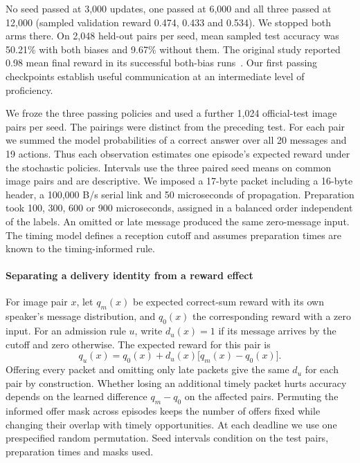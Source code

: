 \documentclass[a4paper,fleqn]{cas-dc}
\begin{document}
No seed passed at 3,000 updates, one passed at 6,000 and all three passed at 12,000 (sampled validation reward 0.474, 0.433 and 0.534). We stopped both arms there. On 2,048 held-out pairs per seed, mean sampled test accuracy was 50.21\% with both biases and 9.67\% without them. The original study reported 0.98 mean final reward in its successful both-bias runs~\citep{eccles2019biases}. Our first passing checkpoints establish useful communication at an intermediate level of proficiency.

We froze the three passing policies and used a further 1,024 official-test image pairs per seed. The pairings were distinct from the preceding test. For each pair we summed the model probabilities of a correct answer over all 20 messages and 19 actions. Thus each observation estimates one episode's expected reward under the stochastic policies. Intervals use the three paired seed means on common image pairs and are descriptive. We imposed a 17-byte packet including a 16-byte header, a 100,000 B/s serial link and 50 microseconds of propagation. Preparation took 100, 300, 600 or 900 microseconds, assigned in a balanced order independent of the labels. An omitted or late message produced the same zero-message input. The timing model defines a reception cutoff and assumes preparation times are known to the timing-informed rule.

\paragraph{Separating a delivery identity from a reward effect}
For image pair $x$, let $q_m(x)$ be expected correct-sum reward with its own speaker's message distribution, and $q_0(x)$ the corresponding reward with a zero input. For an admission rule $u$, write $d_u(x)=1$ if its message arrives by the cutoff and zero otherwise. The expected reward for this pair is
\begin{equation}
 q_u(x)=q_0(x)+d_u(x)\bigl[q_m(x)-q_0(x)\bigr].
 \label{eq:mnist_delivery}
\end{equation}
Offering every packet and omitting only late packets give the same $d_u$ for each pair by construction. Whether losing an additional timely packet hurts accuracy depends on the learned difference $q_m-q_0$ on the affected pairs. Permuting the informed offer mask across episodes keeps the number of offers fixed while changing their overlap with timely opportunities. At each deadline we use one prespecified random permutation. Seed intervals condition on the test pairs, preparation times and masks used.
\end{document}
